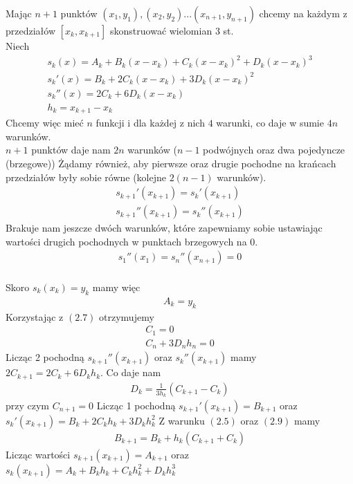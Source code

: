 \documentclass[paper=a4, fontsize=11pt]{scrartcl} %
\numberwithin{equation}{section} %
\numberwithin{figure}{section} %
\numberwithin{table}{section} %
\begin{document}
Mając $n+1$ punktów $(x_{1},y_{1}), (x_{2},y_{2}) ... (x_{n+1}, y_{n+1})$ chcemy na każdym z przedziałów $[x_{k}, x_{k+1}]$ skonstruować wielomian $3$ st. \\
Niech
\begin{gather}
 s_{k}(x) = A_{k} + B_{k}(x - x_{k}) + C_{k}(x - x_{k})^{2} + D_{k}(x - x_{k})^{3} \\
 s_{k}'(x) = B_{k} + 2C_{k}(x - x_{k}) + 3D_{k}(x - x_{k})^{2} \\
 s_{k}''(x) = 2C_{k}+ 6D_{k}(x - x_{k}) \\
 h_{k} = x_{k+1} - x_{k}
\end{gather}
Chcemy więc mieć $n$ funkcji i dla każdej z nich $4$ warunki, co daje w sumie $4n$ warunków. \\
$n+1$ punktów daje nam $2n$ warunków ($n-1$ podwójnych oraz dwa pojedyncze (brzegowe))
Żądamy również, aby pierwsze oraz drugie pochodne na krańcach przedziałów były sobie równe (kolejne $2(n-1)$ warunków).
\begin{align}
s_{k+1}'(x_{k+1}) = s_{k}'(x_{k+1}) \\
s_{k+1}''(x_{k+1}) = s_{k}''(x_{k+1})
\end{align}
Brakuje nam jeszcze dwóch warunków, które zapewniamy sobie ustawiając wartości drugich pochodnych w punktach brzegowych na $0$.
\begin{align}
s_{1}''(x_{1}) = s_{n}''(x_{n+1}) = 0
\end{align}
\\
Skoro $s_{k}(x_{k}) = y_{k}$ mamy więc 
\begin{align}
A_{k} = y_{k}
\end{align}
Korzystając z $(2.7)$ otrzymujemy
\begin{align}
C_{1} = 0 \\
C_{n} + 3D_{n}h_{n} = 0
\end{align}
Licząc 2 pochodną $s_{k+1}''(x_{k+1})$ oraz $s_{k}''(x_{k+1})$ mamy $2C_{k+1} = 2C_{k} + 6D_{k}h_{k}$.
Co daje nam
\begin{align}
D_{k} = \frac{1}{3h_{k}}(C_{k+1} - C_{k})
\end{align}
przy czym $C_{n+1} = 0$ 
\medbreak
Licząc 1 pochodną $s_{k+1}'(x_{k+1}) = B_{k+1}$ oraz $s_{k}'(x_{k+1}) = B_{k} + 2C_{k}h_{k} + 3D_{k}h_{k}^{2}$ \medbreak
Z warunku $(2.5)$ oraz $(2.9)$ mamy
\begin{align}
B_{k+1} = B_{k} +  h_{k}(C_{k+1} + C_{k})
\end{align}
\medbreak
Licząc wartości $s_{k+1}(x_{k+1}) = A_{k+1}$ oraz  $s_{k}(x_{k+1}) = A_{k} + B_{k}h_{k} + C_{k}h_{k}^{2} + D_{k}h_{k}^3$ \medbreak
\end{document}
